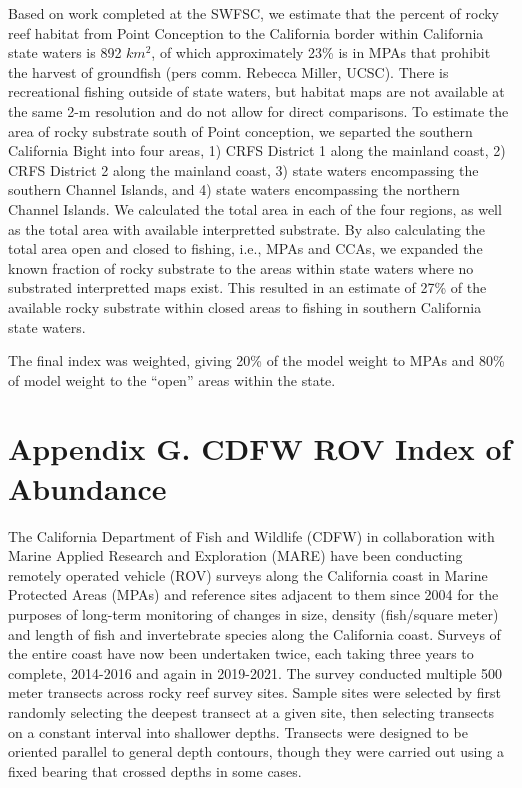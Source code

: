 \documentclass[11pt,
  english,
  letterpaper,
]{article}
\begin{document}
Based on work completed at the SWFSC, we estimate that the percent of rocky reef habitat from Point Conception to the California border within California state waters is 892 \(km^2\), of which approximately 23\% is in MPAs that prohibit the harvest of groundfish (pers comm. Rebecca Miller, UCSC). There is recreational fishing outside of state waters, but habitat maps are not available at the same 2-m resolution and do not allow for direct comparisons. To estimate the area of rocky substrate south of Point conception, we separted the southern California Bight into four areas, 1) CRFS District 1 along the mainland coast, 2) CRFS District 2 along the mainland coast, 3) state waters encompassing the southern Channel Islands, and 4) state waters encompassing the northern Channel Islands. We calculated the total area in each of the four regions, as well as the total area with available interpretted substrate. By also calculating the total area open and closed to fishing, i.e., MPAs and CCAs, we expanded the known fraction of rocky substrate to the areas within state waters where no substrated interpretted maps exist. This resulted in an estimate of 27\% of the available rocky substrate within closed areas to fishing in southern California state waters.

The final index was weighted, giving 20\% of the model weight to MPAs and 80\% of model weight to the ``open'' areas within the state.

\hypertarget{cdfw-rov-index}{%
\section{Appendix G. CDFW ROV Index of Abundance}\label{cdfw-rov-index}}

The California Department of Fish and Wildlife (CDFW) in collaboration with Marine Applied Research and Exploration (MARE) have been conducting remotely operated vehicle (ROV) surveys along the California coast in Marine Protected Areas (MPAs) and reference sites adjacent to them since 2004 for the purposes of long-term monitoring of changes in size, density (fish/square meter) and length of fish and invertebrate species along the California coast. Surveys of the entire coast have now been undertaken twice, each taking three years to complete, 2014-2016 and again in 2019-2021. The survey conducted multiple 500 meter transects across rocky reef survey sites. Sample sites were selected by first randomly selecting the deepest transect at a given site, then selecting transects on a constant interval into shallower depths. Transects were designed to be oriented parallel to general depth contours, though they were carried out using a fixed bearing that crossed depths in some cases.
\end{document}
